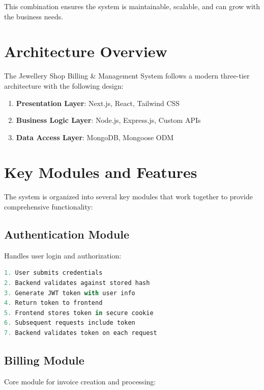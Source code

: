 \documentclass[12pt,a4paper]{report}
\begin{document}
This combination ensures the system is maintainable, scalable, and can grow with the business needs.

\newpage


\section{Architecture Overview}

The Jewellery Shop Billing \& Management System follows a modern three-tier architecture with the following design:

\begin{enumerate}[label=\roman*)]
    \item \textbf{Presentation Layer}: Next.js, React, Tailwind CSS
    \item \textbf{Business Logic Layer}: Node.js, Express.js, Custom APIs
    \item \textbf{Data Access Layer}: MongoDB, Mongoose ODM
\end{enumerate}

\section{Key Modules and Features}

The system is organized into several key modules that work together to provide comprehensive functionality:

\subsection{Authentication Module}

Handles user login and authorization:

\begin{lstlisting}[language=JavaScript, caption=Authentication Flow]
1. User submits credentials
2. Backend validates against stored hash
3. Generate JWT token with user info
4. Return token to frontend
5. Frontend stores token in secure cookie
6. Subsequent requests include token
7. Backend validates token on each request
\end{lstlisting}

\subsection{Billing Module}

Core module for invoice creation and processing:
\end{document}
